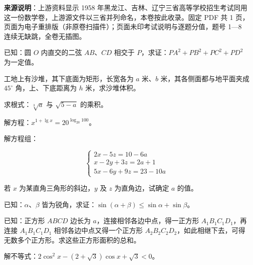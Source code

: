 

\begin{gktip}
\textbf{来源说明}：上游资料显示 1958 年黑龙江、吉林、辽宁三省高等学校招生考试同用这一份数学卷，上游源文件以三省并列命名，本卷按此收录。固定 PDF 共 1 页，页面为电子重排版（非原卷扫描件）；页面未印考试说明与逐题分值，题号 1—8 连续无缺跳，全卷无插图。
\end{gktip}

\begin{question}
已知：圆 $O$ 内直交的二弦 $AB$、$CD$ 相交于 $P$，求证：$PA^{2}+PB^{2}+PC^{2}+PD^{2}$ 为一定值。

\end{question}
\begin{question}
工地上有沙堆，其下底面为矩形，长宽各为 $a$ 米、$b$ 米，其各侧面都与地平面夹成 $45^\circ$ 角，上、下底距离为 $h$ 米，求沙堆体积。

\end{question}
\begin{question}
求根式：$\sqrt[3]{a}$ 与 $\sqrt{5-a}$ 的乘积。

\end{question}
\begin{question}
解方程：$x^{1+\lg x}=20^{\log_{20}100}$。

\end{question}
\begin{question}
解方程组：

\nopagebreak[4]
\[
\begin{cases}
2x-5z=10-6a\\
x-2y+3z=2a+1\\
5x-6y+9z=23-10a
\end{cases}
\]

若 $x$ 为某直角三角形的斜边，$y$ 及 $z$ 为直角边，试确定 $a$ 的值。

\end{question}
\begin{question}
已知：$\alpha$、$\beta$ 皆为锐角，求证：$\sin(\alpha+\beta)\le\sin\alpha+\sin\beta$。

\end{question}
\begin{question}
已知：正方形 $ABCD$ 边长为 $a$，连接相邻各边中点，得一正方形 $A_{1}B_{1}C_{1}D_{1}$，再连接 $A_{1}B_{1}C_{1}D_{1}$ 相邻各边中点又得一个正方形 $A_{2}B_{2}C_{2}D_{2}$，如此相继下去，可得无数多个正方形。求这些正方形面积的总和。

\end{question}
\begin{question}
解不等式：$2\cos^{2}x-(2+\sqrt3)\cos x+\sqrt3<0$。

\end{question}